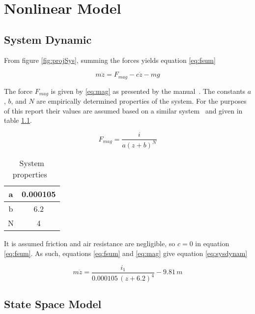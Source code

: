 \chapter{Nonlinear Model} 

\section{System Dynamic}

From figure \ref{fig:projSys}, summing the forces yields equation \ref{eq:fsum}

\begin{equation}
	\label{eq:fsum}
	m\ddot{z} = F_{mag} - c\dot{z} - mg
\end{equation}

The force $F_{mag}$ is given by \ref{eq:mag} as presented by the manual~\cite{manual}.
The constants $a$, $b$, and $N$ are empirically determined properties of the system. 
For the purposes of this report their values are assumed based on a similar system~\cite{paper} and given in table \ref{tbl:magic}.

\begin{equation}
	\label{eq:mag}
	F_{mag} = {\frac {i}{a \left(z+b \right) ^{N}}}
\end{equation}

\begin{table}[h]
	\centering
	\caption{System properties~\cite{paper}}
	\label{tbl:magic}

	\vspace{6pt}
	\begin{tabular}{|c|c|}
		\hline
		a & 0.000105 \\
		\hline
		b & 6.2 \\
		\hline
		N & 4 \\
		\hline
	\end{tabular}
\end{table}

It is assumed friction and air resistance are negligible, so $c=0$ in equation \ref{eq:fsum}. 
As such, equations \ref{eq:fsum} and \ref{eq:mag} give equation \ref{eq:sysdynam}

\begin{equation}
	\label{eq:sysdynam}
	m\ddot{z} = {\frac {i_{1}}{0.000105\,\left(z+6.2 \right) ^{4}}} - 9.81\,m
\end{equation}

\section{State Space Model}

